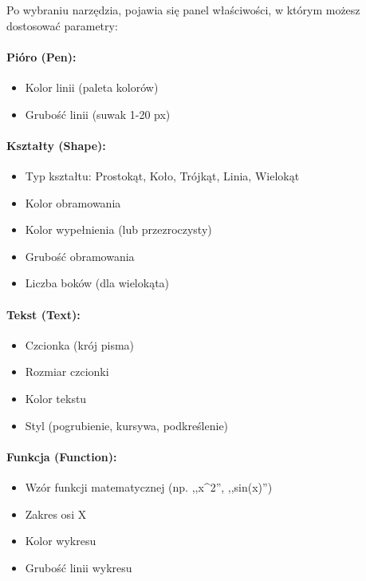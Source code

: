 \documentclass[12pt,a4paper]{article}
\begin{document}
Po wybraniu narzędzia, pojawia się panel właściwości, w którym możesz dostosować parametry:

\paragraph{Pióro (Pen):}
\begin{itemize}
    \item Kolor linii (paleta kolorów)
    \item Grubość linii (suwak 1-20 px)
\end{itemize}

\paragraph{Kształty (Shape):}
\begin{itemize}
    \item Typ kształtu: Prostokąt, Koło, Trójkąt, Linia, Wielokąt
    \item Kolor obramowania
    \item Kolor wypełnienia (lub przezroczysty)
    \item Grubość obramowania
    \item Liczba boków (dla wielokąta)
\end{itemize}

\paragraph{Tekst (Text):}
\begin{itemize}
    \item Czcionka (krój pisma)
    \item Rozmiar czcionki
    \item Kolor tekstu
    \item Styl (pogrubienie, kursywa, podkreślenie)
\end{itemize}

\paragraph{Funkcja (Function):}
\begin{itemize}
    \item Wzór funkcji matematycznej (np. ,,x\textasciicircum 2'', ,,sin(x)'')
    \item Zakres osi X
    \item Kolor wykresu
    \item Grubość linii wykresu
\end{itemize}
\end{document}
